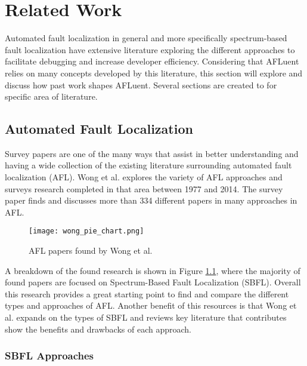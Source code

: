 \chapter{Related Work}
\label{ch:relatedwork}

Automated fault localization in general and more specifically spectrum-based
fault localization have extensive literature exploring the different approaches
to facilitate debugging and increase developer efficiency. Considering that
AFLuent relies on many concepts developed by this literature, this section will
explore and discuss how past work shapes AFLuent. Several sections are created
to for specific area of literature.

\section{Automated Fault Localization}
\label{sec:AFLlit}

Survey papers are one of the many ways that assist in better
understanding and having a wide collection of the existing
literature surrounding automated fault localization (AFL).
Wong et al. \cite{wong2016survey} explores the variety of AFL approaches and
surveys research completed in that area between 1977 and 2014. The survey paper finds and
discusses more than 334 different papers in many approaches in AFL.

\begin{figure}[!htb]
	\begin{center}
		\texttt{[image: wong\_pie\_chart.png]}
		\caption{\label{fig:wong_breakdown} AFL papers found by Wong et al. \cite{wong2016survey}}
	\end{center}
\end{figure}

A breakdown of the found research is shown in Figure \ref{fig:wong_breakdown}, where the
majority of found papers are focused on Spectrum-Based Fault Localization (SBFL).
Overall this research provides a great
starting point to find and compare the different types and approaches of AFL.
Another benefit of this resources is that
Wong et al. \cite{wong2016survey} expands on the types of SBFL
and reviews key literature that contributes show the benefits and drawbacks of
each approach.


\subsection{SBFL Approaches}
\label{subsec:sbfl}

